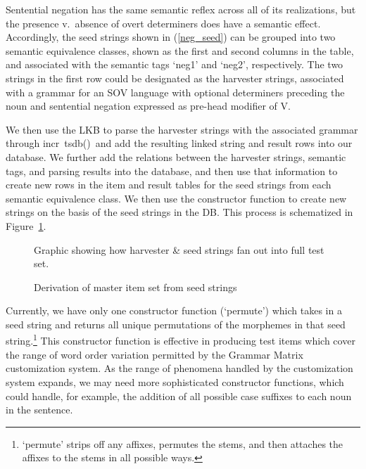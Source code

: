 \documentclass[11pt]{article}
\newcommand{\itsdb}{\mbox{\sf \lbrack incr tsdb()\rbrack}}
\begin{document}
%
Sentential negation has the same semantic reflex across all
of its realizations, but the presence v.\ absence of overt determiners
does have a semantic effect.  Accordingly, the seed strings shown in
(\ref{neg_seed}) can be grouped into two semantic equivalence classes,
shown as the first and second columns in the table, and associated with
the semantic tags `neg1' and `neg2', respectively.  The two strings
in the first row could be designated as the harvester strings, associated
with a grammar for an SOV language with optional determiners preceding
the noun and sentential negation expressed as pre-head modifier of V.

We then use the LKB to parse the harvester strings with the associated
grammar through \itsdb\ and add the resulting linked string and 
result rows into our database.  We further add the relations between the
harvester strings, semantic tags, and parsing results into the database,
and then use that information to create new rows in the item and result tables
for the seed strings from each semantic equivalence class.   We then
use the constructor function to create new strings on the basis of
the seed strings in the DB.  This process is schematized in Figure~\ref{h-to-full}.

\begin{figure}[ht]
\begin{center}

Graphic showing how harvester \& seed strings fan out into full test set.

\end{center}
\caption{Derivation of master item set from seed strings}
\label{h-to-full}
\end{figure}

Currently, we have only one constructor function (`permute') which
takes in a seed string and returns all unique permutations of the
morphemes in that seed string.\footnote{`permute' strips off any
affixes, permutes the stems, and then attaches the affixes to the
stems in all possible ways.}  This constructor function is effective
in producing test items which cover the range of word order variation
permitted by the Grammar Matrix customization system.  As the range of
phenomena handled by the customization system expands, we may need
more sophisticated constructor functions, which could handle, for
example, the addition of all possible case suffixes to each noun
in the sentence.
\end{document}
